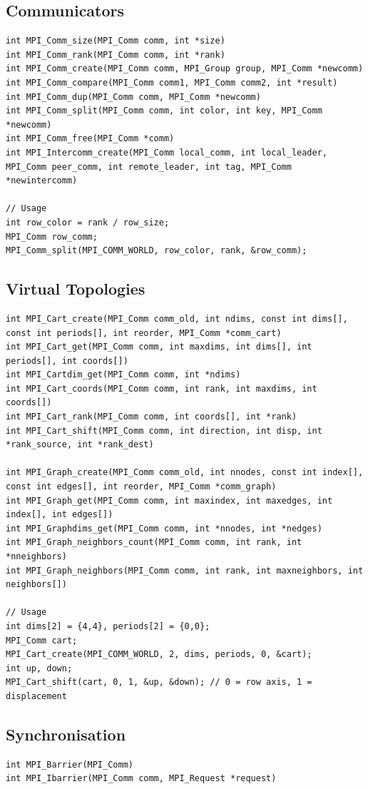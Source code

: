\documentclass{article}
\begin{document}
\subsection{Communicators}
\begin{lstlisting}
int MPI_Comm_size(MPI_Comm comm, int *size)
int MPI_Comm_rank(MPI_Comm comm, int *rank)
int MPI_Comm_create(MPI_Comm comm, MPI_Group group, MPI_Comm *newcomm)
int MPI_Comm_compare(MPI_Comm comm1, MPI_Comm comm2, int *result)
int MPI_Comm_dup(MPI_Comm comm, MPI_Comm *newcomm)
int MPI_Comm_split(MPI_Comm comm, int color, int key, MPI_Comm *newcomm)
int MPI_Comm_free(MPI_Comm *comm)
int MPI_Intercomm_create(MPI_Comm local_comm, int local_leader, MPI_Comm peer_comm, int remote_leader, int tag, MPI_Comm *newintercomm)

// Usage
int row_color = rank / row_size; 
MPI_Comm row_comm;
MPI_Comm_split(MPI_COMM_WORLD, row_color, rank, &row_comm);
\end{lstlisting}

\subsection{Virtual Topologies}
\begin{lstlisting}
int MPI_Cart_create(MPI_Comm comm_old, int ndims, const int dims[], const int periods[], int reorder, MPI_Comm *comm_cart)
int MPI_Cart_get(MPI_Comm comm, int maxdims, int dims[], int periods[], int coords[])
int MPI_Cartdim_get(MPI_Comm comm, int *ndims)
int MPI_Cart_coords(MPI_Comm comm, int rank, int maxdims, int coords[])
int MPI_Cart_rank(MPI_Comm comm, int coords[], int *rank)
int MPI_Cart_shift(MPI_Comm comm, int direction, int disp, int *rank_source, int *rank_dest)

int MPI_Graph_create(MPI_Comm comm_old, int nnodes, const int index[], const int edges[], int reorder, MPI_Comm *comm_graph)
int MPI_Graph_get(MPI_Comm comm, int maxindex, int maxedges, int index[], int edges[])
int MPI_Graphdims_get(MPI_Comm comm, int *nnodes, int *nedges)
int MPI_Graph_neighbors_count(MPI_Comm comm, int rank, int *nneighbors)
int MPI_Graph_neighbors(MPI_Comm comm, int rank, int maxneighbors, int neighbors[])    

// Usage
int dims[2] = {4,4}, periods[2] = {0,0};
MPI_Comm cart;
MPI_Cart_create(MPI_COMM_WORLD, 2, dims, periods, 0, &cart);
int up, down;
MPI_Cart_shift(cart, 0, 1, &up, &down); // 0 = row axis, 1 = displacement
\end{lstlisting}

\subsection{Synchronisation}
\begin{lstlisting}
int MPI_Barrier(MPI_Comm)
int MPI_Ibarrier(MPI_Comm comm, MPI_Request *request)
\end{lstlisting}
\end{document}

